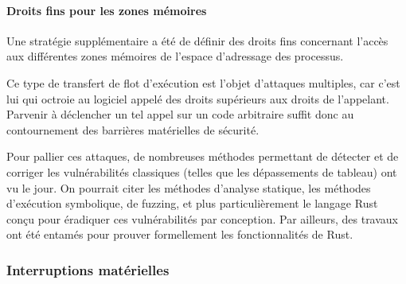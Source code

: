 \paragraph{Droits fins pour les zones mémoires}

Une stratégie supplémentaire a été de définir des droits fins concernant l'accès aux différentes zones mémoires de l'espace d'adressage des processus.




Ce type de transfert de flot d’exécution est l’objet d’attaques multiples, car c’est lui qui octroie au logiciel appelé des droits supérieurs aux droits de l’appelant. Parvenir à déclencher un tel appel sur un code arbitraire suffit donc au contournement des barrières matérielles de sécurité.

Pour pallier ces attaques, de nombreuses méthodes permettant de détecter et de corriger les vulnérabilités classiques (telles que les dépassements de tableau) ont vu le jour. On pourrait citer les méthodes d’analyse statique, les méthodes d’exécution symbolique, de fuzzing, et plus particulièrement le langage Rust conçu pour éradiquer ces vulnérabilités par conception. Par ailleurs, des travaux ont été entamés pour prouver formellement les fonctionnalités de Rust.

			\subsubsection{Interruptions matérielles}

